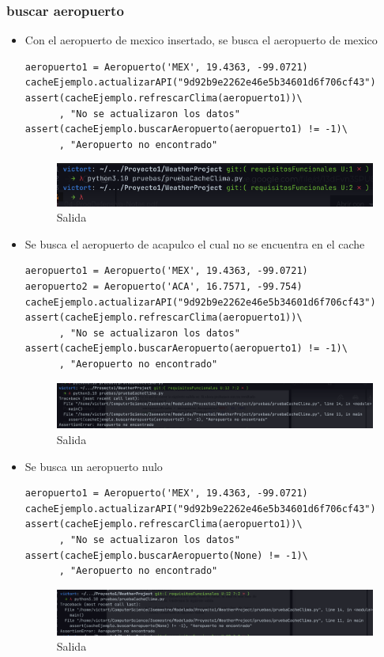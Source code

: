\documentclass[12pt]{article}
\begin{document}
\subsubsection{buscar aeropuerto}
\begin{itemize}
\item Con el aeropuerto de mexico insertado, se busca el aeropuerto de mexico
\begin{verbatim}
aeropuerto1 = Aeropuerto('MEX', 19.4363, -99.0721)
cacheEjemplo.actualizarAPI("9d92b9e2262e46e5b34601d6f706cf43")
assert(cacheEjemplo.refrescarClima(aeropuerto1))\
      , "No se actualizaron los datos"
assert(cacheEjemplo.buscarAeropuerto(aeropuerto1) != -1)\
      , "Aeropuerto no encontrado"
\end{verbatim}
\begin{figure}[h!]
    \centering
    \includegraphics[scale=0.7]{pruebasPy/cache/bien.png}
    \caption{Salida}
  \end{figure}
\item Se busca el aeropuerto de acapulco el cual no se encuentra en el cache
\begin{verbatim}
aeropuerto1 = Aeropuerto('MEX', 19.4363, -99.0721)
aeropuerto2 = Aeropuerto('ACA', 16.7571, -99.754)
cacheEjemplo.actualizarAPI("9d92b9e2262e46e5b34601d6f706cf43")
assert(cacheEjemplo.refrescarClima(aeropuerto1))\
      , "No se actualizaron los datos"
assert(cacheEjemplo.buscarAeropuerto(aeropuerto1) != -1)\
      , "Aeropuerto no encontrado"
\end{verbatim}
 \begin{figure}[h!]
    \centering
    \includegraphics[scale=0.4]{pruebasPy/cache/aeroNoEncontrado.png}
    \caption{Salida}
  \end{figure}
   \newpage

\item Se busca un aeropuerto nulo
\begin{verbatim}
aeropuerto1 = Aeropuerto('MEX', 19.4363, -99.0721)
cacheEjemplo.actualizarAPI("9d92b9e2262e46e5b34601d6f706cf43")
assert(cacheEjemplo.refrescarClima(aeropuerto1))\
      , "No se actualizaron los datos"
assert(cacheEjemplo.buscarAeropuerto(None) != -1)\
      , "Aeropuerto no encontrado"
\end{verbatim}
  \begin{figure}[h!]
    \centering
    \includegraphics[scale=0.4]{pruebasPy/cache/buscaNone.png}
    \caption{Salida}
  \end{figure}
\end{itemize}
\end{document}
